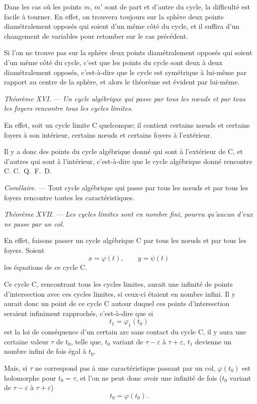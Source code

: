 \documentclass[11pt]{article}
\begin{document}
Dans les cas où les points $m$, $m'$ sont de part et d'autre du cycle, la difficulté est facile à tourner. En effet, on trouvera toujours sur la sphère deux points diamétralement opposés qui soient d'un même côté du cycle, et il suffira d'un changement de variables pour retomber sur le cas précédent.

Si l'on ne trouve pas sur la sphère deux points diamétralement opposés qui soient d'un même côté du cycle, c'est que les points du cycle sont deux à deux diamétralement opposés, c'est-à-dire que le cycle est symétrique à lui-même par rapport au centre de la sphère, et alors le théorème est évident par lui-même.

\emph{Théorème XVI.} --- \emph{Un cycle algébrique qui passe par tous les nœuds et par tous les foyers rencontre tous les cycles limites.}

En effet, soit un cycle limite C quelconque; il contient certains nœuds et certains foyers à son intérieur, certains nœuds et certains foyers à l'extérieur.

Il y a donc des points du cycle algébrique donné qui sont à l'extérieur de C, et d'autres qui sont à l'intérieur, c'est-à-dire que le cycle algébrique donné rencontre C. \hfill\mbox{C. Q. F. D.}

\emph{Corollaire.} --- Tout cycle algébrique qui passe par tous les nœuds et par tous les foyers rencontre toutes les caractéristiques.

\emph{Théorème XVII.} --- \emph{Les cycles limites sont en nombre fini, pourvu qu'aucun d'eux ne passe par un col.}

En effet, faisons passer un cycle algébrique C par tous les nœuds et par tous les foyers. Soient
\[
x=\varphi(t),\qquad y=\psi(t)
\]
les équations de ce cycle C.

Ce cycle C, rencontrant tous les cycles limites, aurait une infinité de points d'intersection avec ces cycles limites, si ceux-ci étaient en nombre infini. Il y aurait donc un point de ce cycle C autour duquel ces points d'intersection seraient infiniment rapprochés, c'est-à-dire que si
\[
t_1=\varphi_1(t_0)
\]
est la loi de conséquence d'un certain arc sans contact du cycle C, il y aura une certaine valeur $\tau$ de $t_0$, telle que, $t_0$ variant de $\tau-\varepsilon$ à $\tau+\varepsilon$, $t_1$ devienne un nombre infini de fois égal à $t_0$.

Mais, si $\tau$ ne correspond pas à une caractéristique passant par un col, $\varphi(t_0)$ est holomorphe pour $t_0=\tau$, et l'on ne peut donc avoir une infinité de fois ($t_0$ variant de $\tau-\varepsilon$ à $\tau+\varepsilon$)
\[
t_0=\varphi(t_0).
\]
\end{document}
